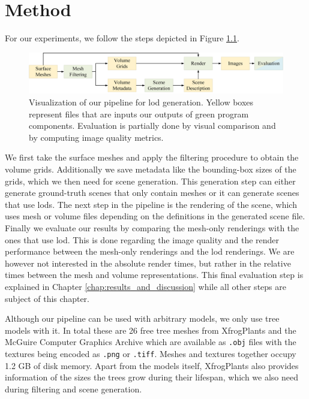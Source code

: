 \chapter{Method}
\label{chap:method}
For our experiments, we follow the steps depicted in Figure \ref{fig:pipeline}.
\begin{figure}[ht]
    \centering
    \includegraphics[width=1.0\linewidth]{img/pipeline.png}
    \caption[Visualization of the pipeline the thesis built upon]{Visualization of our pipeline for \ac{lod} generation. Yellow boxes represent files that are inputs our outputs of green program components. Evaluation is partially done by visual comparison and by computing image quality metrics.}
    \label{fig:pipeline}
\end{figure}
We first take the surface meshes and apply the filtering procedure to obtain the volume grids.
Additionally we save metadata like the bounding-box sizes of the grids, which we then need for scene generation.
This generation step can either generate ground-truth scenes that only contain meshes or it can generate scenes that use \acp{lod}.
The next step in the pipeline is the rendering of the scene, which uses mesh or volume files depending on the definitions in the generated scene file.
Finally we evaluate our results by comparing the mesh-only renderings with the ones that use \ac{lod}.
This is done regarding the image quality and the render performance between the mesh-only renderings and the \ac{lod} renderings.
We are however not interested in the absolute render times, but rather in the relative times between the mesh and volume representations.
This final evaluation step is explained in Chapter \ref{chap:results_and_discussion} while all other steps are subject of this chapter.

Although our pipeline can be used with arbitrary models, we only use tree models with it.
In total these are 26 free tree meshes from XfrogPlants \cite{xfrogplants} and the McGuire Computer Graphics Archive \cite{McGuire2017Data} which are available as \texttt{.obj} files with the textures being encoded as \texttt{.png} or \texttt{.tiff}.
Meshes and textures together occupy 1.2 GB of disk memory.
Apart from the models itself, XfrogPlants also provides information of the sizes the trees grow during their lifespan, which we also need during filtering and scene generation.

